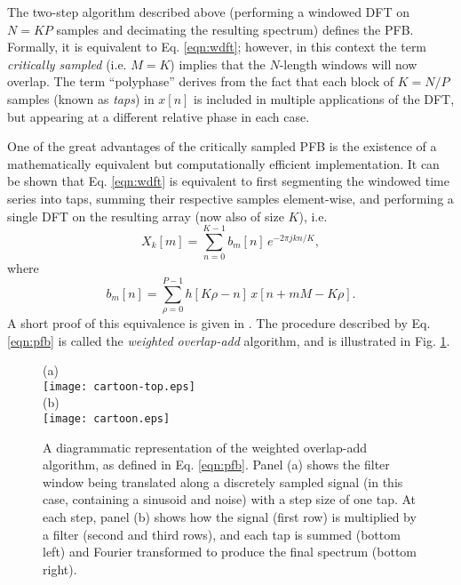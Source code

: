 \documentclass{pasa}%
\begin{document}
The two-step algorithm described above (performing a windowed DFT on $N = KP$ samples and decimating the resulting spectrum) defines the PFB.
Formally, it is equivalent to Eq. \eqref{eqn:wdft}; however, in this context the term \textit{critically sampled} (i.e. $M = K$) implies that the $N$-length windows will now overlap.
The term ``polyphase'' derives from the fact that each block of $K = N/P$ samples (known as \textit{taps}) in $x[n]$ is included in multiple applications of the DFT, but appearing at a different relative phase in each case.

One of the great advantages of the critically sampled PFB is the existence of a mathematically equivalent but computationally efficient implementation.
It can be shown that Eq. \eqref{eqn:wdft} is equivalent to first segmenting the windowed time series into taps, summing their respective samples element-wise, and performing a single DFT on the resulting array (now also of size $K$), i.e.
\begin{equation}
    X_k[m] = \sum_{n=0}^{K-1} b_m[n]\,e^{-2\pi jkn/K},
    \label{eqn:pfb}
\end{equation}
where
\begin{equation*}
    b_m[n] = \sum_{\rho=0}^{P-1} h[K\rho - n]\,x[n + mM - K\rho].
\end{equation*}
A short proof of this equivalence is given in \citet{Harris2011}.
The procedure described by Eq. \eqref{eqn:pfb} is called the \textit{weighted overlap-add} algorithm, and is illustrated in Fig. \ref{fig:pfb}.
\begin{figure}[p]
    \centering
    (a) \\
    \texttt{[image: cartoon-top.eps]} \\
    (b) \\
    \texttt{[image: cartoon.eps]}
    \caption{A diagrammatic representation of the weighted overlap-add algorithm, as defined in Eq. \eqref{eqn:pfb}. Panel (a) shows the filter window being translated along a discretely sampled signal (in this case, containing a sinusoid and noise) with a step size of one tap. At each step, panel (b) shows how the signal (first row) is multiplied by a filter (second and third rows), and each tap is summed (bottom left) and Fourier transformed to produce the final spectrum (bottom right).}
    \label{fig:pfb}
\end{figure}

\end{document}
